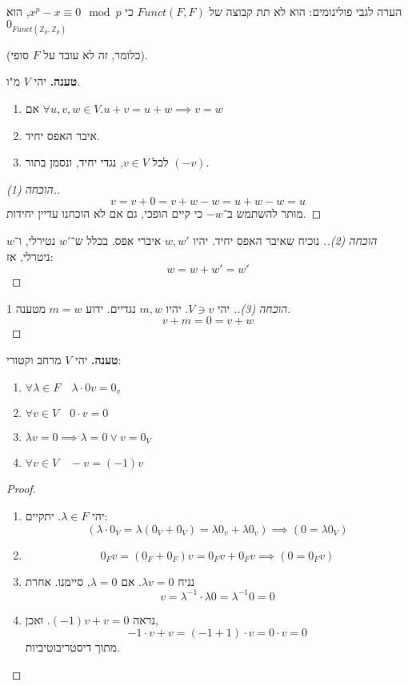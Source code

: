 \documentclass[]{article}
\newcommand\Z     {\mathbb{Z}}
\newcommand\op    {^{-1}}
\begin{document}
	 הערה לגבי פולינומים: הוא לא תת קבוצה של $Funct(F, F)$ כי $x^p - x \equiv 0 \mod p$, הוא
	 $0_{Funct(\Z_p, \Z_p)}$
	 
	 (כלומר, זה לא עובד על $F$ סופי). 
	 
	 \textbf{טענה. }יהי $V$ מ"ו. 
	 \begin{enumerate}
	 	\item אם $\forall u, v, w \in V. u  + v = u + w \implies v = w$
	 	\item איבר האפס יחיד.
	 	\item לכל $v \in V$, נגדי יחיד, ונסמן בתור $(-v)$. 
	 \end{enumerate}
	 
	 \begin{proof}[הוכחה (1).]
	 	\[ v = v + 0 = v + w - w = u + w - w = u \]
	 	מותר להשתמש ב־$-w$ כי קיים הופכי, גם אם לא הוכחנו עדיין יחידות. 
	 \end{proof}
	 
	 \begin{proof}[הוכחה (2).]
	 	נוכיח שאיבר האפס יחיד. יהיו $w, w'$ איברי אפס. בכלל ש־$w'$ נטירלי, ו־$w$ ניטרלי, אז:
	 	\[ w = w + w' = w' \]
	 \end{proof}
	 
	 \begin{proof}[הוכחה (3).]
	 	יהי $V \ni v$. יהיו $m, w$ נגדיים. ידוע $m = w$ מטענה 1. 
	 	\[ v + m = 0 = v + w \]
	 \end{proof}
	 
	 \textbf{טענה. }יהי $V$ מרחב וקטורי:
	 \begin{enumerate}
	 	\item \hfil $\forall \lambda \in F \quad \lambda \cdot 0 v = 0_v$ \hfil 
	 	\item \hfil $\forall v \in V \quad 0 \cdot v = 0 $\hfil 
	 	\item \hfil $\lambda v = 0 \implies \lambda = 0 \lor v = 0_V$ \hfil
	 	\item \hfil $\forall v \in V \quad -v = (-1)v$ \hfil
	 \end{enumerate}
	 \begin{proof}
	 	\begin{enumerate}
	 		\item יהי $\lambda \in F$. יתקיים: 
	 		\[ (\lambda \cdot 0_V = \lambda (0_V + 0_V) = \lambda 0_v + \lambda 0_v) \implies (0 = \lambda 0_V) \]
	 		\item \[ 0_F v = (0_F + 0_F)v = 0_Fv + 0_Fv \implies (0 = 0_Fv) \]
	 		\item נניח $\lambda v = 0$. אם $\lambda = 0$, סיימנו. אחרת \[ v = \lambda\op \cdot \lambda 0 = \lambda\op 0 = 0 \]
	 		\item נראה $(-1)v + v = 0$. ואכן, 
	 		\[ -1 \cdot v + v = (-1 + 1) \cdot v = 0 \cdot v = 0 \]
	 		מתוך דיסטריבוטיביות. 
	 	\end{enumerate}
	 \end{proof}
	 
\end{document}
